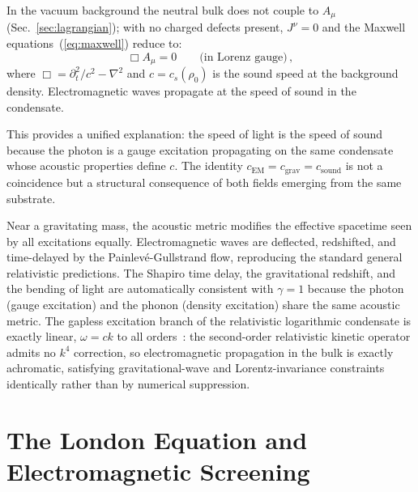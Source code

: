\documentclass[12pt, a4paper]{article}
\begin{document}
In the vacuum background the neutral bulk does not couple to $A_\mu$ (Sec.~\ref{sec:lagrangian}); with no charged defects present, $J^\nu = 0$ and the Maxwell equations~(\ref{eq:maxwell}) reduce to:
\begin{equation}
    \Box A_\mu = 0
    \qquad\text{(in Lorenz gauge)}\,,
\label{eq:em_wave}
\end{equation}
where $\Box = \partial_t^2/c^2 - \nabla^2$ and $c = c_s(\rho_0)$ is the sound speed at the background density. Electromagnetic waves propagate at the speed of sound in the condensate.

This provides a unified explanation: the speed of light is the speed of sound because the photon is a gauge excitation propagating on the same condensate whose acoustic properties define $c$. The identity $c_{\mathrm{EM}} = c_{\mathrm{grav}} = c_{\mathrm{sound}}$ is not a coincidence but a structural consequence of both fields emerging from the same substrate.

Near a gravitating mass, the acoustic metric modifies the effective spacetime seen by all excitations equally. Electromagnetic waves are deflected, redshifted, and time-delayed by the Painlev\'{e}-Gullstrand flow, reproducing the standard general relativistic predictions. The Shapiro time delay, the gravitational redshift, and the bending of light are automatically consistent with $\gamma = 1$ because the photon (gauge excitation) and the phonon (density excitation) share the same acoustic metric. The gapless excitation branch of the relativistic logarithmic condensate is exactly linear, $\omega = ck$ to all orders~\cite{kulangiev_2026a}: the second-order relativistic kinetic operator admits no $k^4$ correction, so electromagnetic propagation in the bulk is exactly achromatic, satisfying gravitational-wave and Lorentz-invariance constraints identically rather than by numerical suppression.


\section{The London Equation and Electromagnetic Screening}
\label{sec:london}
\end{document}
